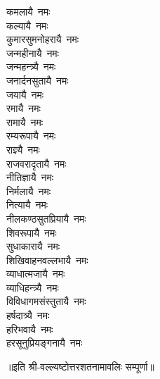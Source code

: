 \begin{flushleft}
\begin{multicols}{2}
कमलायै~नमः\\
कल्यायै~नमः\\
कुमारसुमनोहरायै~नमः\\
जन्महीनायै~नमः\\
जन्महन्त्र्यै~नमः\\
जनार्दनसुतायै~नमः\\
जयायै~नमः\hfill{}\\
रमायै~नमः\\
रामायै~नमः\\
रम्यरूपायै~नमः\\
राज्ञ्यै~नमः\\
राजवरादृतायै~नमः\\
नीतिज्ञायै~नमः\\
निर्मलायै~नमः\\
नित्यायै~नमः\\
नीलकण्ठसुतप्रियायै~नमः\\
शिवरूपायै~नमः\hfill{}\\
सुधाकारायै~नमः\\
शिखिवाहनवल्लभायै~नमः\\
व्याधात्मजायै~नमः\\
व्याधिहन्त्र्यै~नमः\\
विविधागमसंस्तुतायै~नमः\\
हर्षदात्र्यै~नमः\\
हरिभवायै~नमः\\
हरसूनुप्रियङ्गनायै~नमः\\
\end{multicols}
\end{flushleft}
॥इति श्री-वल्ल्यष्टोत्तरशतनामावलिः सम्पूर्णा॥
